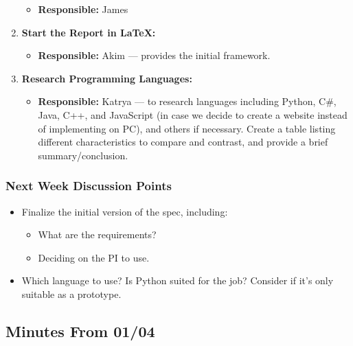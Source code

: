 \documentclass[11pt]{article}
\begin{document}
\begin{enumerate}
  \begin{itemize}
  \tightlist
  \item
    \textbf{Responsible:} James
  \end{itemize}

  \newpage
\item
  \textbf{Start the Report in LaTeX:}

  \begin{itemize}
  \tightlist
  \item
    \textbf{Responsible:} Akim --- provides the initial framework.
  \end{itemize}
\item
  \textbf{Research Programming Languages:}

  \begin{itemize}
  \tightlist
  \item
    \textbf{Responsible:} Katrya --- to research languages including
    Python, C\#, Java, C++, and JavaScript (in case we decide to create
    a website instead of implementing on PC), and others if necessary.
    Create a table listing different characteristics to compare and
    contrast, and provide a brief summary/conclusion.
  \end{itemize}
\end{enumerate}

\hypertarget{next-week-discussion-points}{%
\subsubsection{Next Week Discussion
Points}\label{next-week-discussion-points}}

\begin{itemize}
\tightlist
\item
  Finalize the initial version of the spec, including:

  \begin{itemize}
  \tightlist
  \item
    What are the requirements?
  \item
    Deciding on the PI to use.
  \end{itemize}
\item
  Which language to use? Is Python suited for the job? Consider if it's
  only suitable as a prototype.
\end{itemize}

\hypertarget{minutes-from-0104}{%
\subsection{Minutes From 01/04}\label{minutes-from-0104}}
\end{document}
